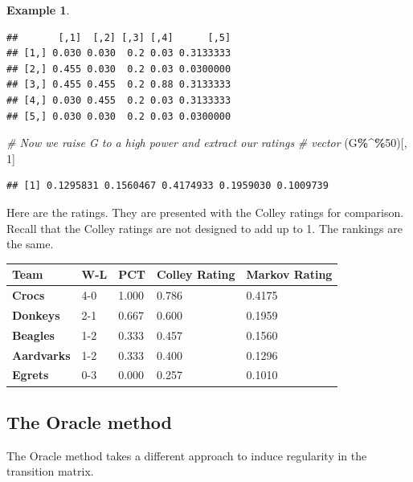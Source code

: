 \documentclass[
]{book}
\newenvironment{Shaded}{\begin{snugshade}}{\end{snugshade}}
\newcommand{\CommentTok}[1]{\textcolor[rgb]{0.56,0.35,0.01}{\textit{#1}}}
\newcommand{\DecValTok}[1]{\textcolor[rgb]{0.00,0.00,0.81}{#1}}
\newcommand{\NormalTok}[1]{#1}
\newcommand{\SpecialCharTok}[1]{\textcolor[rgb]{0.81,0.36,0.00}{\textbf{#1}}}
\theoremstyle{definition}
\theoremstyle{definition}
\newtheorem{example}{Example}[chapter]
\theoremstyle{definition}
\theoremstyle{definition}
\theoremstyle{remark}
\begin{document}
\begin{examplebox}
\begin{example}
\begin{verbatim}
##       [,1]  [,2] [,3] [,4]      [,5]
## [1,] 0.030 0.030  0.2 0.03 0.3133333
## [2,] 0.455 0.030  0.2 0.03 0.0300000
## [3,] 0.455 0.455  0.2 0.88 0.3133333
## [4,] 0.030 0.455  0.2 0.03 0.3133333
## [5,] 0.030 0.030  0.2 0.03 0.0300000
\end{verbatim}

\begin{Shaded}
\begin{Highlighting}[]
\CommentTok{\# Now we raise G to a high power and extract our ratings}
\CommentTok{\# vector}
\NormalTok{(G}\SpecialCharTok{\%\^{}\%}\DecValTok{50}\NormalTok{)[, }\DecValTok{1}\NormalTok{]}
\end{Highlighting}
\end{Shaded}

\begin{verbatim}
## [1] 0.1295831 0.1560467 0.4174933 0.1959030 0.1009739
\end{verbatim}

Here are the ratings. They are presented with the Colley ratings for comparison. Recall that the Colley ratings are not designed to add up to 1. The rankings are the same.

\begin{longtable}[]{@{}lllll@{}}
\toprule\noalign{}
\textbf{Team} & W-L & PCT & Colley Rating & Markov Rating \\
\midrule\noalign{}
\endhead
\bottomrule\noalign{}
\endlastfoot
\textbf{Crocs} & 4-0 & 1.000 & 0.786 & 0.4175 \\
\textbf{Donkeys} & 2-1 & 0.667 & 0.600 & 0.1959 \\
\textbf{Beagles} & 1-2 & 0.333 & 0.457 & 0.1560 \\
\textbf{Aardvarks} & 1-2 & 0.333 & 0.400 & 0.1296 \\
\textbf{Egrets} & 0-3 & 0.000 & 0.257 & 0.1010 \\
\end{longtable}

\end{example}

\end{examplebox}

\subsection*{The Oracle method}\label{the-oracle-method}

The Oracle method takes a different approach to induce regularity in the transition matrix.
\end{document}
